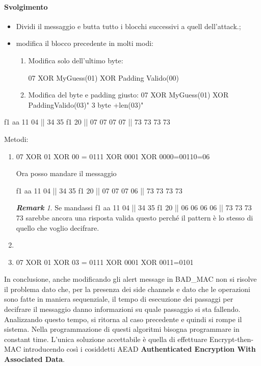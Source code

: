 \documentclass{article}
\theoremstyle{remark}
\newtheorem*{remark}{\textbf{Remark}}
\begin{document}
\paragraph{Svolgimento} 
\begin{itemize}
    \item Dividi il messaggio  e butta tutto i blocchi successivi a quell dell'attack.;
    \item modifica il blocco precedente in molti modi:\begin{enumerate}
        \item Modifica solo dell'ultimo byte:\begin{center}
            07 XOR MyGuess(01) XOR Padding Valido(00)
        \end{center}
        \item Modifica del byte e padding giusto: 07 XOR MyGuess(01) XOR PaddingValido(03)" 3 byte +len(03)"
    \end{enumerate}
\end{itemize}
 \begin{center}
    f1 aa 11 04 || 34 35 f1 20 || 07 07 07 07 || 73 73 73 73 
\end{center}
Metodi:\begin{enumerate}
    \item \begin{center}
        07 XOR 01 XOR 00 = 0111 XOR 0001 XOR 0000=00110=06
    \end{center}
    Ora posso mandare il messaggio\begin{center}
    f1 aa 11 04 || 34 35 f1 20 || 07 07 07 06 || 73 73 73 73 
    \begin{remark}
    Se mandassi  f1 aa 11 04 || 34 35 f1 20 || 06 06 06 06 || 73 73 73 73 sarebbe ancora una risposta valida questo perché il pattern è lo stesso di quello che voglio decifrare.
    \end{remark}\end{center}
    \item \item \begin{center}
        07 XOR 01 XOR 03 = 0111 XOR 0001 XOR 0011=0101
    \end{center}
\end{enumerate}
In conclusione, anche modificando gli alert message in BAD\_MAC non si risolve il problema dato che, per la presenza dei side channels e dato che le operazioni sono fatte in maniera sequenziale, il tempo di esecuzione dei passaggi per decifrare il messaggio danno informazioni su quale passaggio si sta fallendo. Analizzando questo tempo, si ritorna al caso precedente e quindi si rompe il sistema. Nella programmazione di questi algoritmi bisogna programmare in constant time.
L'unica soluzione accettabile è quella di effettuare Encrypt-then-MAC introducendo così i cosiddetti AEAD\textbf{ Authenticated Encryption With Associated Data}.
\end{document}
